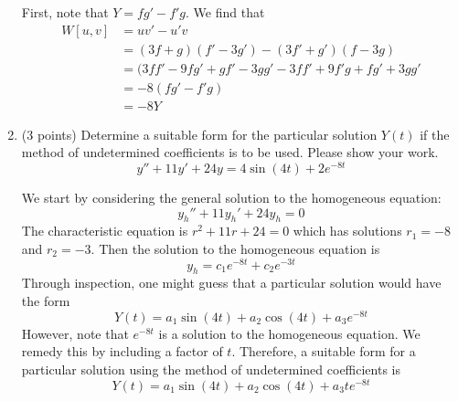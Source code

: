 \documentclass[11pt, titlepage]{article}
\begin{document}
\begin{enumerate}
            \begin{solution}
                First, note that $Y = fg' - f'g$. We find that
                \begin{align*}
                    W[u, v] &= uv' - u'v \\
                            &= (3f+g)(f'-3g') - (3f'+g')(f-3g) \\
                            &= (3ff' - 9fg' + gf' - 3gg' - 3ff' + 9f'g + fg' +
                            3gg' \\
                            &= -8(fg' - f'g) \\
                            &= -8Y
                \end{align*}
            \end{solution}
        \pagebreak

        \item (3 points) Determine a suitable form for the particular solution
            $Y(t)$ if the method of undetermined coefficients is to be used.
            Please show your work.
            \[
                y'' + 11y' + 24y = 4 \sin(4t) + 2e^{-8t}
            \] 
            \begin{solution}
                We start by considering the general solution to the homogeneous
                equation:
                \[
                y_h'' + 11y_h' + 24y_h = 0
                \] 
                The characteristic equation is $r^2 + 11r + 24 = 0$ which has
                solutions $r_1 = -8$ and $r_2 = -3$. Then the solution to the
                homogeneous equation is
                \[
                y_h = c_1 e^{-8t} + c_2 e^{-3t}
                \] 
                Through inspection, one might guess that a particular solution
                would have the form
                \[
                    Y(t) = a_1 \sin(4t) + a_2 \cos(4t) + a_3 e^{-8t}
                \] 
                However, note that $e^{-8t}$ is a solution to the homogeneous
                equation. We remedy this by including a factor of $t$.
                Therefore, a suitable form for a particular solution using the
                method of undetermined coefficients is
                \[
                    Y(t) = a_1 \sin(4t) + a_2 \cos(4t) + a_3 t e^{-8t}
                \] 
            \end{solution}
        \pagebreak


\end{enumerate}
\end{document}
